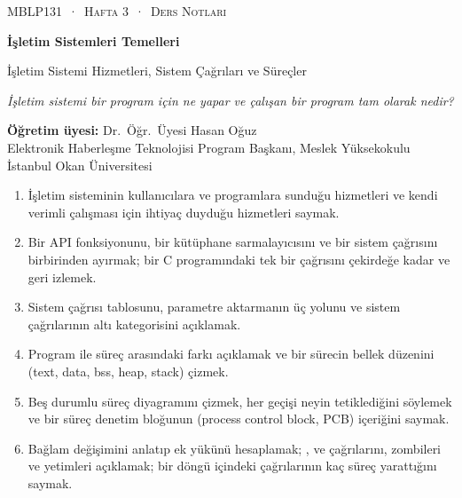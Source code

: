 \setlength{\emergencystretch}{3em}
\thispagestyle{empty}
\begin{tcolorbox}[enhanced,colback=dark,colframe=dark,arc=0pt,boxrule=0pt,
  left=18pt,right=18pt,top=20pt,bottom=20pt,coltext=white]
{\small\color{mint}\textsc{MBLP131 \,·\, Hafta 3 \,·\, Ders Notları}}\par\medskip
{\headfont\fontsize{26}{30}\selectfont\bfseries İşletim Sistemleri Temelleri}\par\medskip
{\large İşletim Sistemi Hizmetleri, Sistem Çağrıları ve Süreçler}\par\smallskip
{\small\itshape\color{white!70} İşletim sistemi bir program için ne yapar ve çalışan bir program tam olarak nedir?}
\end{tcolorbox}

\vspace{0.4em}
\begin{minipage}[t]{0.70\linewidth}
\small
\textbf{Öğretim üyesi:} Dr.\ Öğr.\ Üyesi Hasan Oğuz\\
Elektronik Haberleşme Teknolojisi Program Başkanı, Meslek Yüksekokulu\\
İstanbul Okan Üniversitesi
\end{minipage}

\vspace{0.8em}
\begin{keyidea}
\begin{enumerate}[leftmargin=1.4em]
  \item İşletim sisteminin kullanıcılara ve programlara sunduğu hizmetleri ve kendi verimli çalışması için ihtiyaç duyduğu hizmetleri saymak.
  \item Bir API fonksiyonunu, bir kütüphane sarmalayıcısını ve bir sistem çağrısını birbirinden ayırmak; bir C programındaki tek bir  çağrısını çekirdeğe kadar ve geri izlemek.
  \item Sistem çağrısı tablosunu, parametre aktarmanın üç yolunu ve sistem çağrılarının altı kategorisini açıklamak.
  \item Program ile süreç arasındaki farkı açıklamak ve bir sürecin bellek düzenini (text, data, bss, heap, stack) çizmek.
  \item Beş durumlu süreç diyagramını çizmek, her geçişi neyin tetiklediğini söylemek ve bir süreç denetim bloğunun (process control block, PCB) içeriğini saymak.
  \item Bağlam değişimini anlatıp ek yükünü hesaplamak; ,  ve  çağrılarını, zombileri ve yetimleri açıklamak; bir döngü içindeki  çağrılarının kaç süreç yarattığını saymak.
\end{enumerate}
\end{keyidea}

